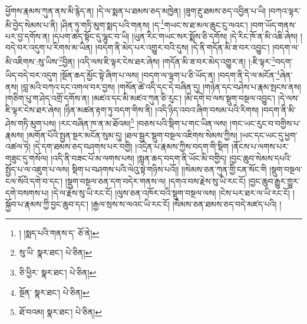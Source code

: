 ཕྱོགས་རྣམས་ཀུན་ནས་མི་རྙེད་ན། །དེ་ལ་སྨན་པ་ཐམས་ཅད་མཁྱེན། །ཟུག་རྔུ་ཐམས་ཅད་འབྱིན་པ་ཡི། །བཀའ་ལྟར་མི་བྱེད་སེམས་པ་ནི། །ཤིན་ཏུ་གཏི་མུག་སྨད་པའི་གནས། །ད་\footnote{། །སྨད་པའི་གནས་ད་  ཅོ་ནེ། }གཡང་ས་ཐ་མལ་ཆུང་ངུ་ལའང་། །བག་ཡོད་གནས་པར་བྱ་དགོས་ན། །དཔག་ཚད་སྟོང་དུ་ལྷུང་བ་ཡི། །ཡུན་རིང་གཡང་སར་སྨོས་ཅི་དགོས། །དེ་རིང་ཁོ་ན་མི་འཆི་ཞེས། །བདེ་བར་འདུག་པ་རིགས་མ་ཡིན། །བདག་ནི་མེད་པར་འགྱུར་བའི་དུས། །དེ་ནི་གདོན་མི་ཟ་བར་འབྱུང་། །བདག་ལ་མི་འཇིགས་:སུ་ཡིས་\footnote{སུ་ཡི་  སྣར་ཐང་།  པེ་ཅིན། }བྱིན། །འདི་ལས་ཇི་ལྟར་ངེས་ཐར་ཞེས། །གདོན་མི་ཟ་བར་མེད་འགྱུར་ན། །:ཇི་ལྟར་\footnote{ཅི་ཕྱིར་  སྣར་ཐང་།  པེ་ཅིན། }བདག་ཡིད་བདེ་བར་འདུག །སྔོན་ཆད་མྱོང་སྟེ་ཞིག་པ་ལས། །བདག་ལ་ལྷག་པ་ཅི་ཡོད་ན། །བདག་ནི་དེ་ལ་མངོན་\footnote{སྔོན་  སྣར་ཐང་།  པེ་ཅིན། }ཞེན་ནས། །བླ་མའི་བཀའ་དང་འགལ་བར་བྱས། །གསོན་ཚེ་འདི་དང་དེ་བཞིན་དུ། །གཉེན་དང་བཤེས་པ་རྣམ་སྤངས་ནས། །གཅིག་པུ་ག་ཤེད་འགྲོ་དགོས་ན། །མཛའ་དང་མི་མཛའ་ཀུན་ཅི་རུང་། །མི་དགེ་བ་ལས་སྡུག་བསྔལ་འབྱུང་། །དེ་ལས་ཇི་ལྟར་ངེས་ཐར་ཞེས། །ཉིན་མཚན་རྟག་ཏུ་བདག་གིས་ནི། །འདི་ཉིད་འབའ་ཞིག་བསམ་པའི་རིགས། །བདག་ནི་མི་ཤེས་གཏི་མུག་པས། །རང་བཞིན་ཁ་ན་མ་ཐོའམ།\footnote{ཐོ་བའམ།  སྣར་ཐང་།  པེ་ཅིན། } །བཅས་པའི་སྡིག་པ་གང་ཡིན་ལས། །གང་ཡང་རུང་བ་བགྱིས་པ་རྣམས། །མགོན་པོའི་སྤྱན་སྔར་མངོན་སུམ་དུ། །ཐལ་སྦྱར་སྡུག་བསྔལ་འཇིགས་སེམས་ཀྱིས། །ཡང་དང་ཡང་དུ་ཕྱག་འཚལ་ཏེ། །དེ་དག་ཐམས་ཅད་བཤགས་པར་བགྱི། །འདྲེན་པ་རྣམས་ཀྱིས་བདག་གི་སྡིག །ནོངས་པ་ལགས་པར་གཟུང་དུ་གསོལ། །འདི་ནི་བཟང་པོ་མ་ལགས་པས། །སླན་ཆད་བདག་ནི་ཡོང་མི་བགྱིད། །བྱང་ཆུབ་སེམས་དཔའི་སྤྱོད་པ་ལ་འཇུག་པ་ལས། སྡིག་པ་བཤགས་པའི་ལེའུ་སྟེ་གཉིས་པའོ།། །།སེམས་ཅན་ཀུན་གྱི་ངན་སོང་གི །སྡུག་བསྔལ་ངལ་སོའི་དགེ་བ་དང་། །སྡུག་བསྔལ་ཅན་དག་བདེར་གནས་ལ། །དགའ་བས་རྗེས་སུ་ཡི་རང་ངོ། །བྱང་ཆུབ་རྒྱུར་གྱུར་དགེ་བསགས་པ། །དེ་ལ་རྗེས་སུ་ཡི་རང་ངོ། །ལུས་ཅན་འཁོར་བའི་སྡུག་བསྔལ་ལས། །ངེས་པར་ཐར་ལ་ཡི་རང་ངོ། །སྐྱོབ་པ་རྣམས་ཀྱི་བྱང་ཆུབ་དང་། །རྒྱལ་སྲས་ས་ལའང་ཡི་རང་ངོ། །སེམས་ཅན་ཐམས་ཅད་བདེ་མཛད་པའི། །
